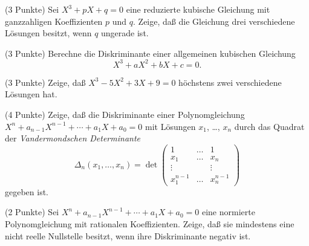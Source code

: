 \documentclass{algsheet}
\author{Dipl.-Math.~Franz Vogler}
\date{23.~November 2010}
\begin{document}
                \maketitle






\begin{exercise}(3 Punkte)\newline
     Sei \(X^3 + p X + q = 0\) eine reduzierte kubische Gleichung mit ganzzahligen
     Koeffizienten \(p\) und \(q\). Zeige, daß die Gleichung drei verschiedene
     Lösungen besitzt, wenn \(q\) ungerade ist.
\end{exercise}

\begin{exercise}(3 Punkte)\newline
    Berechne die Diskriminante einer allgemeinen kubischen Gleichung
    \[X^3 + a X^2 + b X + c = 0.\]
\end{exercise}

\begin{exercise}(3 Punkte)\newline
    Zeige, daß \(X^3 - 5 X^2 + 3 X  + 9=0\) höchstens zwei verschiedene Lösungen
    hat.
\end{exercise}

\begin{exercise}(4 Punkte)\newline
    Zeige, daß die Diskriminante einer Polynomgleichung
    \(X^n + a_{n - 1} X^{n - 1} + \dotsb + a_1 X + a_0 = 0\) mit Lösungen
    \(x_1\), \dots, \(x_n\) durch das Quadrat der \emph{Vandermondschen Determinante}
    \[
      \Delta_n(x_1,\dots,x_n)=\det \begin{pmatrix} 1 & \dots & 1 \\
                x_1 & \dots & x_n \\
                \vdots & & \vdots \\
                x_1^{n - 1} & \dots & x_n^{n - 1}
             \end{pmatrix}
    \]
    gegeben ist.
\end{exercise}

\begin{exercise}(2 Punkte)\newline
    Sei \(X^n + a_{n - 1} X^{n - 1} + \dotsb + a_1 X + a_0=0\) eine normierte
    Polynomgleichung mit rationalen Koeffizienten. Zeige, daß sie mindestens
    eine nicht reelle Nullstelle besitzt, wenn ihre Diskriminante negativ ist.
\end{exercise}
\end{document}
